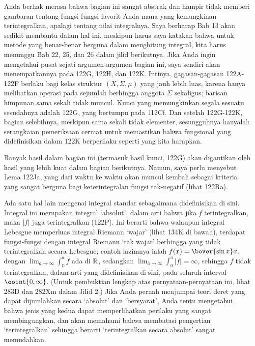 {Anda berhak merasa bahwa bagian ini sangat abstrak dan hampir tidak
memberi gambaran tentang fungsi-fungsi favorit Anda mana yang kemungkinan
terintegralkan, apalagi tentang nilai integralnya. Saya berharap Bab 13
akan sedikit membantu dalam hal ini, meskipun harus saya katakan bahwa
untuk metode yang benar-benar berguna dalam menghitung integral, kita
harus menunggu Bab 22, 25, dan 26 dalam jilid berikutnya. Jika Anda ingin
mengetahui pusat sejati argumen-argumen bagian ini, saya sendiri akan
menempatkannya pada 122G, 122H, dan 122K. Intinya, gagasan-gagasan
122A-122F berlaku bagi kelas struktur $(X,\Sigma,\mu)$ yang jauh lebih
luas, karena hanya melibatkan operasi pada sejumlah berhingga anggota
$\Sigma$ sekaligus; barisan himpunan sama sekali tidak muncul. Kunci
yang memungkinkan segala sesuatu sesudahnya adalah 122G, yang bertumpu
pada 112Cf. Dan setelah 122G-122K, bagian selebihnya, meskipun sama sekali
tidak elementer, sesungguhnya hanyalah serangkaian pemeriksaan cermat
untuk memastikan bahwa fungsional yang didefinisikan dalam 122K
berperilaku seperti yang kita harapkan.

Banyak hasil dalam bagian ini (termasuk hasil kunci, 122G) akan digantikan
oleh hasil yang lebih kuat dalam bagian berikutnya. Namun, saya perlu
menyebut Lema 122Ja, yang dari waktu ke waktu akan muncul kembali sebagai
kriteria yang sangat berguna bagi keterintegralan fungsi tak-negatif
(lihat 122Ra).

Ada satu hal lain mengenai integral standar sebagaimana didefinisikan di
sini. Integral ini merupakan integral `absolut', dalam arti bahwa jika
$f$ terintegralkan, maka $|f|$ juga terintegralkan (122P). Ini berarti
bahwa walaupun integral Lebesgue memperluas integral Riemann `wajar'
(lihat 134K di bawah), terdapat fungsi-fungsi dengan integral Riemann
`tak wajar' berhingga yang tidak terintegralkan secara Lebesgue; contoh lazimnya
ialah $f(x)=\bover{\sin x}x$, dengan
$\lim_{a\to\infty}\int_0^af$ ada di $\Bbb R$, sedangkan
$\lim_{a\to\infty}\int_0^a|f|=\infty$, sehingga $f$ tidak terintegralkan,
dalam arti yang didefinisikan di sini, pada seluruh interval
$\ooint{0,\infty}$. (Untuk pembuktian lengkap atas pernyataan-pernyataan
ini, lihat 283D dan 282Xm dalam Jilid 2.) Jika Anda pernah menjumpai teori
deret yang dapat dijumlahkan secara `absolut' dan `bersyarat', Anda tentu
mengetahui bahwa jenis yang kedua dapat memperlihatkan perilaku yang
sangat membingungkan, dan akan memahami bahwa membatasi pengertian
`terintegralkan' sehingga berarti `terintegralkan secara absolut' sangat
memudahkan.

}
